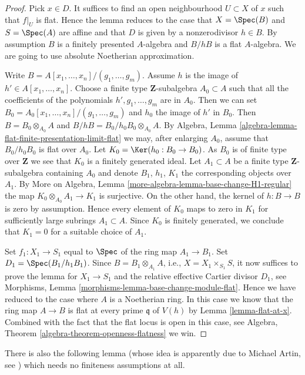 \begin{proof}
Pick $x \in D$. It suffices to find an open neighbourhood $U \subset X$
of $x$ such that $f|_U$ is flat. Hence the lemma reduces to the case
that $X = \Spec(B)$ and $S = \Spec(A)$ are affine
and that $D$ is given by a nonzerodivisor $h \in B$. By assumption
$B$ is a finitely presented $A$-algebra and $B/hB$ is a flat
$A$-algebra. We are going to use absolute Noetherian approximation.

\medskip\noindent
Write $B = A[x_1, \ldots, x_n]/(g_1, \ldots, g_m)$. Assume
$h$ is the image of $h' \in A[x_1, \ldots, x_n]$. Choose a finite type
$\mathbf{Z}$-subalgebra $A_0 \subset A$ such that all the coefficients
of the polynomials $h', g_1, \ldots, g_m$ are in $A_0$. Then we can set
$B_0 = A_0[x_1, \ldots, x_n]/(g_1, \ldots, g_m)$ and $h_0$ the image
of $h'$ in $B_0$. Then $B = B_0 \otimes_{A_0} A$ and
$B/hB = B_0/h_0B_0 \otimes_{A_0} A$. By Algebra, Lemma
\ref{algebra-lemma-flat-finite-presentation-limit-flat}
we may, after enlarging $A_0$, assume that $B_0/h_0B_0$ is flat
over $A_0$. Let $K_0 = \Ker(h_0 : B_0 \to B_0)$.
As $B_0$ is of finite type over $\mathbf{Z}$ we see that $K_0$ is
a finitely generated ideal. Let $A_1 \subset A$ be a finite type
$\mathbf{Z}$-subalgebra containing $A_0$ and denote $B_1$, $h_1$, $K_1$
the corresponding objects over $A_1$. By
More on Algebra, Lemma \ref{more-algebra-lemma-base-change-H1-regular}
the map $K_0 \otimes_{A_0} A_1 \to K_1$ is surjective. On the other hand,
the kernel of $h : B \to B$ is zero by assumption. Hence every element
of $K_0$ maps to zero in $K_1$ for sufficiently large subrings
$A_1 \subset A$. Since $K_0$ is finitely generated, we conclude that
$K_1 = 0$ for a suitable choice of $A_1$.

\medskip\noindent
Set $f_1 : X_1 \to S_1$ equal to $\Spec$ of the
ring map $A_1 \to B_1$. Set $D_1 = \Spec(B_1/h_1B_1)$.
Since $B = B_1 \otimes_{A_1} A$, i.e., $X = X_1 \times_{S_1} S$,
it now suffices to prove the lemma for $X_1 \to S_1$ and the relative
effective Cartier divisor $D_1$, see
Morphisms, Lemma \ref{morphisms-lemma-base-change-module-flat}.
Hence we have reduced to the case where $A$ is a Noetherian ring.
In this case we know that the ring map $A \to B$ is flat at every
prime $\mathfrak q$ of $V(h)$ by
Lemma \ref{lemma-flat-at-x}.
Combined with the fact that the flat locus is open in this case, see
Algebra, Theorem \ref{algebra-theorem-openness-flatness}
we win.
\end{proof}

\noindent
There is also the following lemma (whose idea is apparently
due to Michael Artin, see \cite{Nobile}) which needs no finiteness
assumptions at all.


